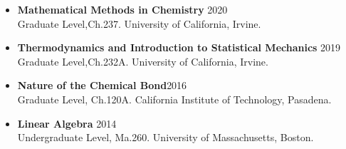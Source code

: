 \documentclass[letterpaper]{article}
\begin{document}
\begin{itemize}
    \item \textbf{Mathematical Methods in Chemistry} \hfill 2020\\
    Graduate Level,Ch.237. University of California, Irvine.
    \vspace{-0.05in}
    \item \textbf{Thermodynamics and Introduction to Statistical Mechanics
    }\hfill 2019\\
    Graduate Level,Ch.232A. University of California, Irvine.
    \vspace{-0.05in}
    \item \textbf{Nature of the Chemical Bond}\hfill 2016\\
    Graduate Level, Ch.120A. California Institute of Technology, Pasadena.
    \vspace{-0.05in}
    \item \textbf{Linear Algebra} \hfill 2014\\
    Undergraduate Level, Ma.260. University of Massachusetts, Boston.
\end{itemize}
\end{document}
